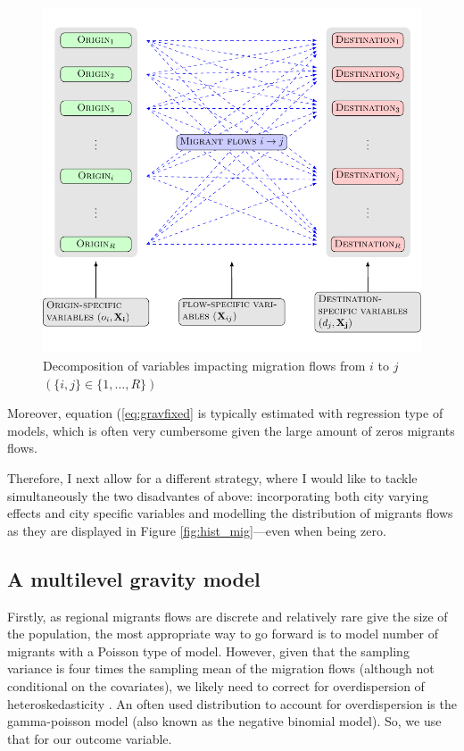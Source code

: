\documentclass[12pt, parskip, abstracton,notitlepage]{scrartcl}
\begin{document}
\begin{figure}[ht]\centering %
	\includegraphics[width=\linewidth]{../fig/gravity_network.pdf}
	\caption{Decomposition of variables impacting migration flows from $i$ to $j$ $\left(\{i,j\} \in \{1,\ldots, R\}\right)$}
	\label{fig:gravity_network}
\end{figure}

Moreover, equation
(\ref{eq:gravfixed} is typically estimated with regression
type of models, which is often very cumbersome given the large
amount of zeros migrants flows.

Therefore, I next allow for a different strategy, where I
would like to tackle simultaneously the two disadvantes of above:
incorporating both city varying effects and city specific variables and
modelling the distribution of migrants flows as they are
displayed in Figure \ref{fig:hist_mig}---even when being zero.

\subsection{A multilevel gravity model}

Firstly, as regional migrants flows are discrete and
relatively rare give the size of the population, the most
appropriate way to go forward is to model number of migrants
with a Poisson type of model. However, given that the sampling
variance is four times the sampling mean of the migration
flows (although not conditional on the covariates), we likely
need to correct for overdispersion of heteroskedasticity
\citep[][states that heteroskedasticity (rather than the
presence of too many zeros) is responsible for the main
differences.]{silva2006log}. An often used distribution to
account for overdispersion is the gamma-poisson model (also
known as the negative binomial model). So, we use that for our
outcome variable.
\end{document}
